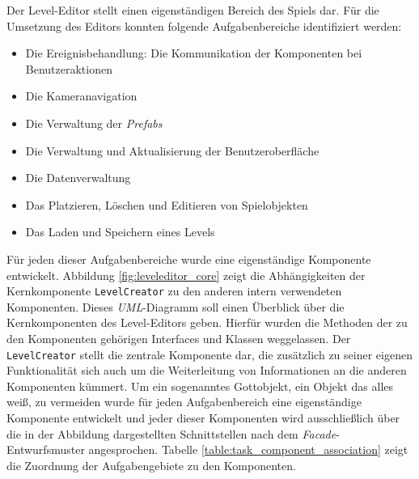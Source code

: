 Der Level-Editor stellt einen eigenständigen Bereich des Spiels dar. Für die Umsetzung des Editors konnten folgende Aufgabenbereiche identifiziert werden:

\begin{itemize}
	\item Die Ereignisbehandlung: Die Kommunikation der Komponenten bei Benutzeraktionen
	\item Die Kameranavigation
	\item Die Verwaltung der \textit{Prefabs}	
	\item Die Verwaltung und Aktualisierung der Benutzeroberfläche
	\item Die Datenverwaltung
	\item Das Platzieren, Löschen und Editieren von Spielobjekten
	\item Das Laden und Speichern eines Levels
\end{itemize} 

Für jeden dieser Aufgabenbereiche wurde eine eigenständige Komponente entwickelt. Abbildung \ref{fig:leveleditor_core} zeigt die Abhängigkeiten der Kernkomponente \texttt{LevelCreator} zu den anderen intern verwendeten Komponenten. Dieses \textit{UML}-Diagramm soll einen Überblick über die Kernkomponenten des Level-Editors geben. Hierfür wurden die Methoden der zu den Komponenten gehörigen Interfaces und Klassen weggelassen. Der \texttt{LevelCreator} stellt die zentrale Komponente dar, die zusätzlich zu seiner eigenen Funktionalität sich auch um die Weiterleitung von Informationen an die anderen Komponenten kümmert. Um ein sogenanntes Gottobjekt, ein Objekt das alles weiß, zu vermeiden wurde für jeden Aufgabenbereich eine eigenständige Komponente entwickelt und jeder dieser Komponenten wird ausschließlich über die in der Abbildung dargestellten Schnittstellen nach dem \textit{Facade}-Entwurfsmuster\cite{Gamma.2011} angesprochen. Tabelle \ref{table:task_component_association} zeigt die Zuordnung der Aufgabengebiete zu den Komponenten.


